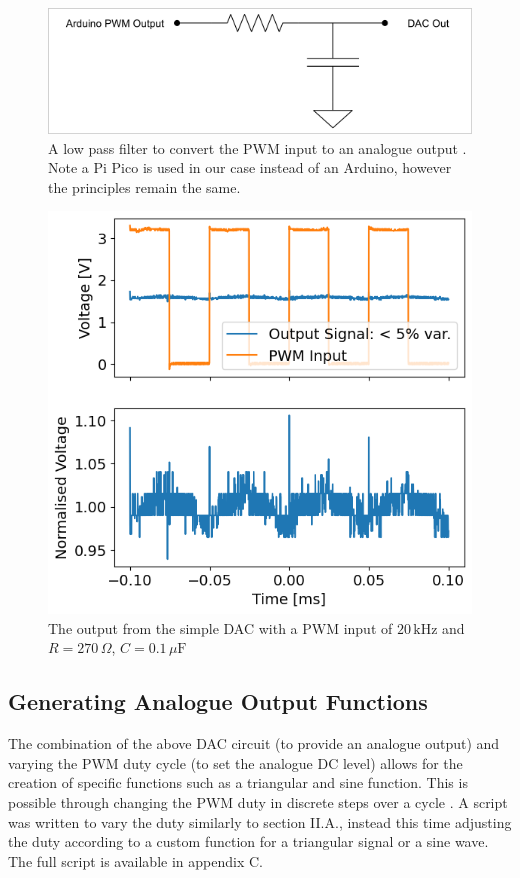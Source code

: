 \documentclass[%
 reprint,
 amsmath,amssymb,
 aps,
]{revtex4-2}
\begin{document}
    \begin{figure}
        \includegraphics[width=0.9\columnwidth]{Images/dac.png}
        \caption{\label{fig:DAC}A low pass filter to convert the PWM input to an analogue output \cite{ucd}. Note a Pi Pico is used in our case instead of an Arduino, however the principles remain the same.}
    \end{figure}
    \begin{figure}
        \includegraphics[width=0.9\columnwidth]{Images/dacVariations.png}
        \caption{\label{fig:dacVariations} The output from the simple DAC with a PWM input of $20\,\text{kHz}$ and $R=270\,\Omega$, $C=0.1\,\mu\text{F}$}
    \end{figure}

    \subsection{Generating Analogue Output Functions}
    The combination of the above DAC circuit (to provide an analogue output) and varying the PWM duty cycle (to set the analogue DC level) allows for the creation of specific functions such as a triangular and sine function. This is possible through changing the PWM duty in discrete steps over a cycle \cite{ucd}. A script was written to vary the duty similarly to section II.A., instead this time adjusting the duty according to a custom function for a triangular signal or a sine wave. The full script is available in appendix C.
\end{document}
